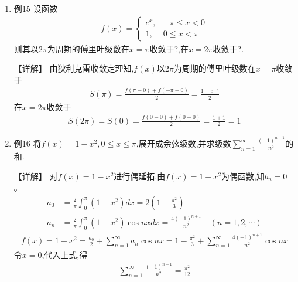 \documentclass[12pt, a4paper, oneside, UTF8]{ctexbook}
\begin{document}
\begin{enumerate}[label=\arabic*.,start=15]
    \item 例15 设函数
    \begin{align*}
    f(x)=\begin{cases}
    e^x, & -\pi\leq x<0 \\
    1, & 0\leq x<\pi
    \end{cases}
    \end{align*}
    则其以$2\pi$为周期的傅里叶级数在$x=\pi$收敛于?,在$x=2\pi$收敛于?.
    \begin{solution}
    【详解】
    由狄利克雷收敛定理知,$f(x)$以$2\pi$为周期的傅里叶级数在$x=\pi$收敛于
    \begin{align*}
    S(\pi)=\frac{f(\pi-0)+f(-\pi+0)}{2}=\frac{1+e^{-\pi}}{2}
    \end{align*}
    在$x=2\pi$收敛于
    \begin{align*}
    S(2\pi)=S(0)=\frac{f(0-0)+f(0+0)}{2}=\frac{1+1}{2}=1
    \end{align*}
    \end{solution}
    
    \item 例16 将$f(x)=1-x^2,0\leq x\leq\pi$,展开成余弦级数,并求级数$\sum_{n=1}^{\infty}\frac{(-1)^{n-1}}{n^2}$的和.
    
    \begin{solution}
    【详解】
    对$f(x)=1-x^2$进行偶延拓,由$f(x)=1-x^2$为偶函数,知$b_n=0$。
    \begin{align*}
    a_0&=\frac{2}{\pi}\int_0^\pi(1-x^2)dx=2\left(1-\frac{\pi^2}{3}\right) \\
    a_n&=\frac{2}{\pi}\int_0^\pi(1-x^2)\cos nx dx=\frac{4(-1)^{n+1}}{n^2} \quad (n=1,2,\cdots)
    \end{align*}
    \begin{align*}
    f(x)=1-x^2=\frac{a_0}{2}+\sum_{n=1}^{\infty}a_n\cos nx=1-\frac{\pi^2}{3}+\sum_{n=1}^{\infty}\frac{4(-1)^{n+1}}{n^2}\cos nx
    \end{align*}
    令$x=0$,代入上式,得
    \begin{align*}
    \sum_{n=1}^{\infty}\frac{(-1)^{n-1}}{n^2}=\frac{\pi^2}{12}
    \end{align*}
    \end{solution}
\end{enumerate}

\ifx\allfiles\undefined
\end{document}

